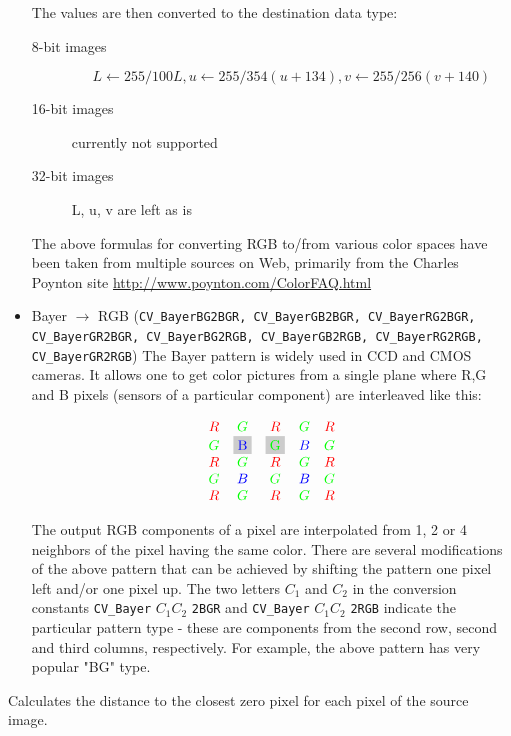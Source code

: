 \begin{itemize}
The values are then converted to the destination data type:
\begin{description}
\item[8-bit images]
\[L \leftarrow 255/100 L, u \leftarrow 255/354 (u + 134), v \leftarrow 255/256 (v + 140) \]
\item[16-bit images] currently not supported
\item[32-bit images] L, u, v are left as is
\end{description}

The above formulas for converting RGB to/from various color spaces have been taken from multiple sources on Web, primarily from the Charles Poynton site \url{http://www.poynton.com/ColorFAQ.html}

 \item Bayer $\rightarrow$ RGB (\texttt{CV\_BayerBG2BGR, CV\_BayerGB2BGR, CV\_BayerRG2BGR, CV\_BayerGR2BGR, CV\_BayerBG2RGB, CV\_BayerGB2RGB, CV\_BayerRG2RGB, CV\_BayerGR2RGB}) The Bayer pattern is widely used in CCD and CMOS cameras. It allows one to get color pictures from a single plane where R,G and B pixels (sensors of a particular component) are interleaved like this:

\newcommand{\R}{\color{red}R}
\newcommand{\G}{\color{green}G}
\newcommand{\B}{\color{blue}B}


\[
\definecolor{BackGray}{rgb}{0.8,0.8,0.8}
\begin{array}{ c c c c c }
\R&\G&\R&\G&\R\\
\G&\colorbox{BackGray}{\B}&\colorbox{BackGray}{\G}&\B&\G\\
\R&\G&\R&\G&\R\\
\G&\B&\G&\B&\G\\
\R&\G&\R&\G&\R
\end{array}
\]

The output RGB components of a pixel are interpolated from 1, 2 or
4 neighbors of the pixel having the same color. There are several
modifications of the above pattern that can be achieved by shifting
the pattern one pixel left and/or one pixel up. The two letters
$C_1$ and $C_2$
in the conversion constants
\texttt{CV\_Bayer} $ C_1 C_2 $ \texttt{2BGR}
and
\texttt{CV\_Bayer} $ C_1 C_2 $ \texttt{2RGB}
indicate the particular pattern
type - these are components from the second row, second and third
columns, respectively. For example, the above pattern has very
popular "BG" type.
\end{itemize}



\label{distanceTransform}
Calculates the distance to the closest zero pixel for each pixel of the source image.

